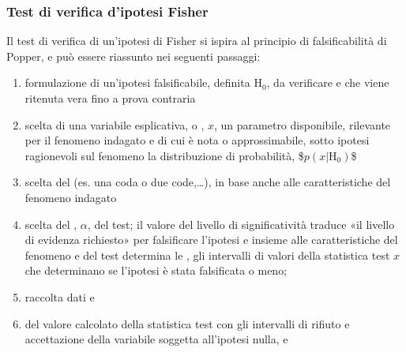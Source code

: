 \documentclass[letterpaper,10pt,italian]{jupyterBook}
\begin{document}
\subsubsection{Test di verifica d’ipotesi \sphinxhyphen{} Fisher}
\label{\detokenize{ch/statistics/test-fisher-coin-1:test-di-verifica-d-ipotesi-fisher}}\label{\detokenize{ch/statistics/test-fisher-coin-1::doc}}
\sphinxAtStartPar
Il test di verifica di un’ipotesi di Fisher si ispira al principio di falsificabilità di Popper, e può essere riassunto nei seguenti passaggi:
\begin{enumerate}
%
\item {} 
\sphinxAtStartPar
formulazione di un’ipotesi falsificabile, definita  \(\text{H}_0\), da verificare e che viene ritenuta vera fino a prova contraria

\item {} 
\sphinxAtStartPar
scelta di una variabile esplicativa, o , \(x\), un parametro disponibile, rilevante per il fenomeno indagato e di cui è nota \sphinxhyphen{} o approssimabile, sotto ipotesi ragionevoli sul fenomeno \sphinxhyphen{} la distribuzione di probabilità,
\$\(p(x|\text{H}_0)\)\$

\item {} 
\sphinxAtStartPar
scelta del  (es. una coda o due code,…), in base anche alle caratteristiche del fenomeno indagato

\item {} 
\sphinxAtStartPar
scelta del , \(\alpha\), del test; il valore del livello di significatività traduce «il livello di evidenza richiesto» per falsificare l’ipotesi e \sphinxhyphen{} insieme alle caratteristiche del fenomeno e del test \sphinxhyphen{} determina le , gli intervalli di valori della statistica test \(x\) che determinano se l’ipotesi è stata falsificata o meno;

\item {} 
\sphinxAtStartPar
raccolta dati e 

\item {} 
\sphinxAtStartPar
{} del valore calcolato della statistica test con gli intervalli di rifiuto e accettazione della variabile soggetta all’ipotesi nulla, e 

\end{enumerate}
\end{document}
